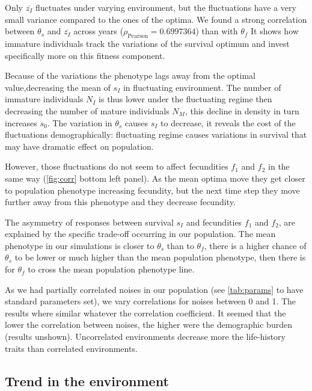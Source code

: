 Only $\overline{z_I}$ fluctuates under varying environment, but the fluctuations have a very small variance compared to the ones of the optima. We found a strong correlation between $\theta_s$ and $\overline{z_I}$ across years ($\rho_{\text{Pearson}} = 0.6997364$) than with $\theta_f$ It shows how immature individuals track the variations of the survival optimum and invest specifically more on this fitness component.

Because of the variations the phenotype lags away from the optimal value,decreasing the mean of $s_I$ in fluctuating environment. The number of immature individuals $N_I$ is thus lower under the fluctuating regime then decreasing the number of mature individuals $N_M$, this decline in density in turn increases $s_0$. The variation in $\theta_s$ causes $s_I$ to decrease, it reveals the cost of the fluctuations demographically: fluctuating regime causes variations in survival that may have dramatic effect on population.

However, those fluctuations do not seem to affect fecundities $f_1$ and $f_2$ in the same way (\autoref{fig:corr} bottom left panel). As the mean optima move they get closer to population phenotype increasing fecundity, but the next time step they move further away from this phenotype and they decrease fecundity.

The asymmetry of responses between  survival $s_I$ and  fecundities $f_1$ and $f_2$, are explained by the specific trade-off occurring in our population. The mean phenotype in our simulations is closer to $\theta_s$ than to $\theta_f$, there is a higher chance of $\theta_s$ to be lower or much higher than the mean population phenotype, then there is for $\theta_f$ to cross the mean population phenotype line.

As we had partially correlated noises in our population (see \autoref{tab:params} to have standard parameters set), we vary correlations for noises between 0 and 1. The results where similar whatever the correlation coefficient. It seemed that the lower the correlation between noises, the higher were the demographic burden (results unshown). Uncorrelated environments decrease more the life-history traits than correlated environments.

\subsection*{Trend in the environment}

